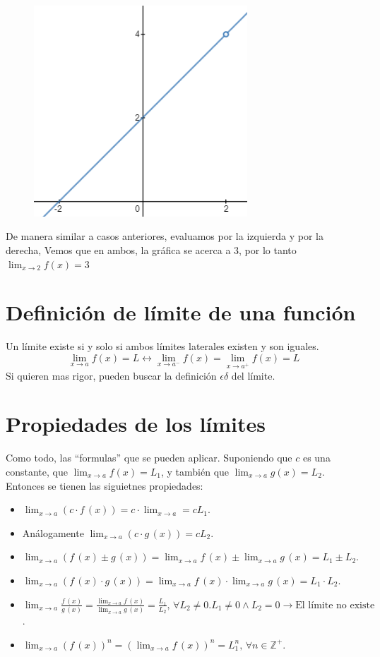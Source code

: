 \documentclass[letterpaper, 12pt]{article}
\begin{document}
    \begin{figure}
        \centering
        \includegraphics[width=8cm]{limite.PNG}
    \end{figure}
    De manera similar a casos anteriores, evaluamos por la izquierda y por la derecha, Vemos que en ambos, la gráfica se acerca a 3, por lo tanto \(\lim_{x\rightarrow 2}f(x)=3\)
    \section{Definición de límite de una función}
    Un límite existe si y solo si ambos límites laterales existen y son iguales.
    \[\lim_{x\rightarrow a}f(x)=L \leftrightarrow \lim_{x \rightarrow a^-}f(x)=\lim_{x \rightarrow a^+}f(x)=L\]
    Si quieren mas rigor, pueden buscar la definición \(\epsilon \delta\) del límite.
    \section{Propiedades de los límites}
    Como todo, las ``formulas'' que se pueden aplicar. Suponiendo que \(c\) es una constante, que \(\lim_{x\rightarrow a} f(x)=L_1\), y también que \(\lim_{x \rightarrow a} g(x)=L_2\). Entonces se tienen las siguietnes propiedades:
    \begin{itemize}
        \item \(\lim_{x \rightarrow a}\left(c\cdot f\,(x)\right)= c \cdot \lim_{x \rightarrow a}=cL_1\).
        \item Análogamente \(\lim_{x \rightarrow a} \left(c \cdot g\,(x)\right)=cL_2\).
        \item \(\lim_{x \rightarrow a}\left(f\,(x)\pm g\,(x)\right)=\lim_{x \rightarrow a}f\,(x)\pm \lim_{x \rightarrow a}g\,(x)=L_1 \pm L_2\).
        \item \(\lim_{x \rightarrow a}\left(f\,(x)\cdot g\,(x)\right)=\lim_{x \rightarrow a}f\,(x)\cdot \lim_{x \rightarrow a}g\,(x)=L_1\cdot L_2\).
        \item \(\lim_{x \rightarrow a}\frac{f\,(x)}{g\,(x)}=\frac{\lim_{x\rightarrow a}f\,(x)}{\lim_{x \rightarrow a}g\,(x)}=\frac{L_1}{L_2},\,\forall L_2\neq 0. L_1\neq 0 \land L_2=0\rightarrow \text{El límite no existe}\).
        \item \(\lim_{x \rightarrow a}\left(f\,(x)\right)^n=\left(\lim_{x \rightarrow a}f\,(x)\right)^n=L_1^n,\, \forall n\in \mathbb{Z}^+\).
    \end{itemize}
\end{document}
